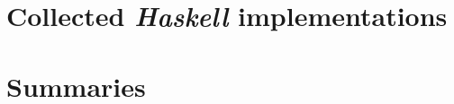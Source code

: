 \documentclass[12pt,
               a4paper,
               numbers=noenddot,
               final]{scrbook}
\numberwithin{equation}{section}
\begin{document}
\clearpage
\appendix

\chapter{Collected \emph{Haskell} implementations}\label{sec:Appendix}


\chapter{Summaries}



\backmatter
\vspace{\fill}
\printbibliography

\end{document}
